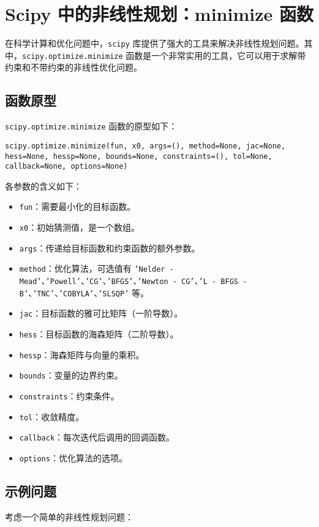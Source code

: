 \documentclass{article}
\begin{document}
\section{Scipy 中的非线性规划：minimize 函数}

在科学计算和优化问题中，\texttt{scipy} 库提供了强大的工具来解决非线性规划问题。其中，\texttt{scipy.optimize.minimize} 函数是一个非常实用的工具，它可以用于求解带约束和不带约束的非线性优化问题。

\subsection{函数原型}
\texttt{scipy.optimize.minimize} 函数的原型如下：
\begin{lstlisting}[style=pythonstyle]
scipy.optimize.minimize(fun, x0, args=(), method=None, jac=None, hess=None, hessp=None, bounds=None, constraints=(), tol=None, callback=None, options=None)
\end{lstlisting}
各参数的含义如下：
\begin{itemize}
    \item \texttt{fun}：需要最小化的目标函数。
    \item \texttt{x0}：初始猜测值，是一个数组。
    \item \texttt{args}：传递给目标函数和约束函数的额外参数。
    \item \texttt{method}：优化算法，可选值有 \texttt{'Nelder - Mead'}、\texttt{'Powell'}、\texttt{'CG'}、\texttt{'BFGS'}、\texttt{'Newton - CG'}、\texttt{'L - BFGS - B'}、\texttt{'TNC'}、\texttt{'COBYLA'}、\texttt{'SLSQP'} 等。
    \item \texttt{jac}：目标函数的雅可比矩阵（一阶导数）。
    \item \texttt{hess}：目标函数的海森矩阵（二阶导数）。
    \item \texttt{hessp}：海森矩阵与向量的乘积。
    \item \texttt{bounds}：变量的边界约束。
    \item \texttt{constraints}：约束条件。
    \item \texttt{tol}：收敛精度。
    \item \texttt{callback}：每次迭代后调用的回调函数。
    \item \texttt{options}：优化算法的选项。
\end{itemize}

\subsection{示例问题}
考虑一个简单的非线性规划问题：
\end{document}
